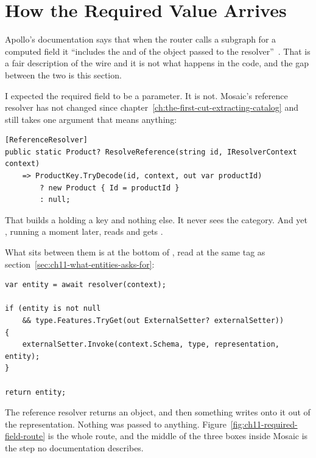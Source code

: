 \section{How the Required Value Arrives}
\label{sec:ch11-how-the-value-arrives}
%

Apollo's documentation says that when the router calls a subgraph for a
computed field it \enquote{includes the  and  of the
 object passed to the
resolver}~\autocite{apollo2026contributefields}. That is a fair description of
the wire and it is not what happens in the code, and the gap between the two is
this section.

I expected the required field to be a parameter. It is not. Mosaic's reference
resolver has not changed since
chapter~\ref{ch:the-first-cut-extracting-catalog} and still takes one argument
that means anything:

\begin{verbatim}
[ReferenceResolver]
public static Product? ResolveReference(string id, IResolverContext context)
    => ProductKey.TryDecode(id, context, out var productId)
        ? new Product { Id = productId }
        : null;
\end{verbatim}

That builds a  holding a key and nothing else. It never sees the
category. And yet , running a moment later, reads
 and gets .

%
What sits between them is at the bottom of , read at the
same tag as section~\ref{sec:ch11-what-entities-asks-for}:

\begin{verbatim}
var entity = await resolver(context);

if (entity is not null
    && type.Features.TryGet(out ExternalSetter? externalSetter))
{
    externalSetter.Invoke(context.Schema, type, representation, entity);
}

return entity;
\end{verbatim}

The reference resolver returns an object, and then something writes onto it out
of the representation. Nothing was passed to anything.
Figure~\ref{fig:ch11-required-field-route} is the whole route, and the middle
of the three boxes inside Mosaic is the step no documentation describes.


